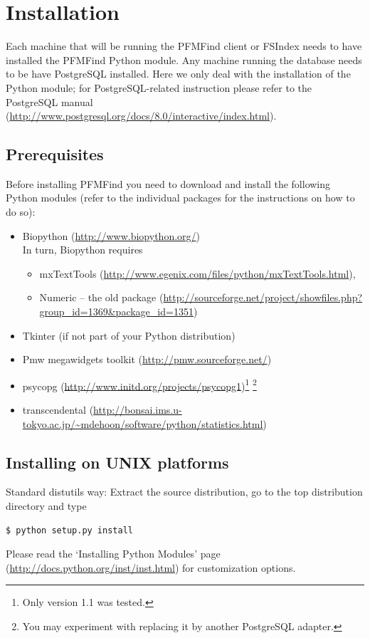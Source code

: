 \documentclass[11pt]{article}
\begin{document}
\section{Installation}

Each machine that will be running the PFMFind client or FSIndex needs to have installed the PFMFind Python module. Any machine running the database needs to be have PostgreSQL installed. Here we only deal with the installation of the Python module; for PostgreSQL-related instruction please refer to the PostgreSQL manual (\url{http://www.postgresql.org/docs/8.0/interactive/index.html}).

\subsection{Prerequisites}
Before installing PFMFind you need to download and install the following Python modules (refer to the individual packages for the instructions on how to do so):

\begin{itemize}
\item Biopython (\url{http://www.biopython.org/})\\
In turn, Biopython requires
\begin{itemize}
\item mxTextTools (\url{http://www.egenix.com/files/python/mxTextTools.html}),
\item Numeric -- the old package (\url{http://sourceforge.net/project/showfiles.php?group_id=1369&package_id=1351})
\end{itemize}
\item Tkinter (if not part of your Python distribution)
\item Pmw megawidgets toolkit (\url{http://pmw.sourceforge.net/})
\item psycopg (\url{http://www.initd.org/projects/psycopg1})\footnote{Only version 1.1 was tested.} \footnote{You may experiment with replacing it by another PostgreSQL adapter.}
\item transcendental (\url{http://bonsai.ims.u-tokyo.ac.jp/~mdehoon/software/python/statistics.html})
\end{itemize}

\subsection{Installing on UNIX platforms}

Standard distutils way: Extract the source distribution, go to the top distribution directory and type
\begin{verbatim}
$ python setup.py install
\end{verbatim}
Please read the `Installing Python Modules' page (\url{http://docs.python.org/inst/inst.html}) for 
customization options.
\end{document}
